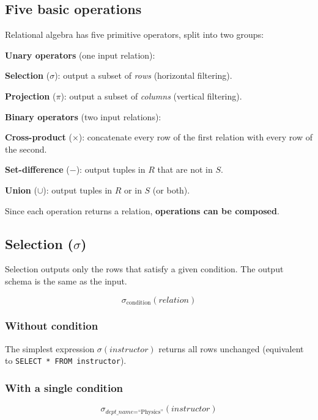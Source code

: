 \documentclass[../../dis.tex]{subfiles}
\begin{document}
\subsection{Five basic operations}
Relational algebra has five primitive operators, split into two groups:

\textbf{Unary operators} (one input relation):
\begin{dashlist}
    \item \textbf{Selection} ($\sigma$): output a subset of \emph{rows} (horizontal filtering).
    \item \textbf{Projection} ($\pi$): output a subset of \emph{columns} (vertical filtering).
\end{dashlist}

\textbf{Binary operators} (two input relations):
\begin{dashlist}
    \item \textbf{Cross-product} ($\times$): concatenate every row of the first relation with every row of the second.
    \item \textbf{Set-difference} ($-$): output tuples in $R$ that are not in $S$.
    \item \textbf{Union} ($\cup$): output tuples in $R$ or in $S$ (or both).
\end{dashlist}

Since each operation returns a relation, \textbf{operations can be composed}.

\subsection{Selection ($\sigma$)}
Selection outputs only the rows that satisfy a given condition. The output schema is the same as the input.

\[ \sigma_{\text{condition}}(\textit{relation}) \]

\subsubsection*{Without condition}
The simplest expression $\sigma(\textit{instructor})$ returns all rows unchanged (equivalent to \lstinline[style=SQLStyle]{SELECT * FROM instructor}).

\subsubsection*{With a single condition}
\[ \sigma_{\textit{dept\_name} = \text{``Physics''}}(\textit{instructor}) \]
\end{document}
